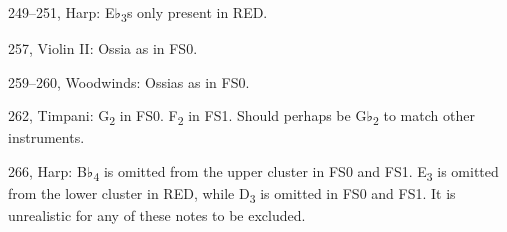 \documentclass[twoside]{article}
\begin{document}
\begin{hangparas}{15pt}{1}
\begin{multicols}{2}
249--251, Harp: E♭\textsubscript{3}s only present in RED.

257, Violin II: Ossia as in FS0.

259--260, Woodwinds: Ossias as in FS0.

262, Timpani: G\textsubscript{2} in FS0. F\textsubscript{2} in FS1. Should perhaps be G♭\textsubscript{2} to match other instruments.

266, Harp: B♭\textsubscript{4} is omitted from the upper cluster in FS0 and FS1. E\textsubscript{3} is omitted from the lower cluster in RED, while D\textsubscript{3} is omitted in FS0 and FS1. It is unrealistic for any of these notes to be excluded.

\end{multicols}

\end{hangparas}
\end{document}
